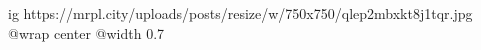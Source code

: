 
 
 
 
 

\ifcmt
  ig https://mrpl.city/uploads/posts/resize/w/750x750/qlep2mbxkt8j1tqr.jpg
  @wrap center
  @width 0.7
\fi
